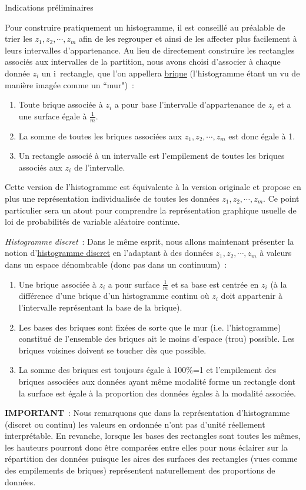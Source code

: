 \documentclass[10pt]{report}
\begin{document}
\begin{IndicList}{Indications préliminaires}
\begin{enumerate}
\end{enumerate}
Pour construire pratiquement un histogramme, il est conseillé au préalable de trier les $z_1,z_2,\cdots,z_m$ afin de les regrouper et ainsi de les affecter  plus facilement à leurs intervalles d'appartenance. Au lieu de directement construire les rectangles associés aux intervalles de la partition, nous avons choisi d'associer à chaque donnée $z_i$ un i\ieme\ rectangle, que l'on appellera \underline{brique} (l'histogramme étant un vu  de manière imagée comme un ``mur")~:
\begin{enumerate}
\item Toute brique associée à $z_i$ a pour base l'intervalle d'appartenance de $z_i$ et a une surface égale à $\frac1m$.
\item La somme de toutes les briques associées aux $z_1,z_2,\cdots,z_m$ est donc égale à 1.
\item Un rectangle associé à un intervalle est l'empilement de toutes les briques associés aux $z_i$ de l'intervalle.  
\end{enumerate}
Cette version de l'histogramme est équivalente à la version originale et propose en plus une représentation individualisée de toutes les données $z_1,z_2,\cdots,z_m$. Ce point particulier sera un atout pour comprendre la représentation graphique usuelle de loi de probabilités de variable aléatoire continue. 
\item \textit{Histogramme discret}~: Dans le même esprit, nous allons maintenant présenter la notion d'\underline{histogramme discret} en l'adaptant à des données $z_1,z_2,\cdots,z_m$ à valeurs dans un espace dénombrable (donc pas dans un continuum)~:
\begin{enumerate}
\item Une brique associée à $z_i$ a pour surface $\frac1m$ et sa base est centrée en $z_i$ (à la différence d'une brique d'un histogramme continu où $z_i$ doit appartenir à l'intervalle représentant la base de la brique).
\item Les bases des briques sont fixées de sorte que le mur (i.e. l'histogramme) constitué de l'ensemble des briques ait le moins d'espace (trou) possible. Les briques voisines doivent se toucher dès que possible.
\item La somme des briques est toujours égale à 100\%=1 et l'empilement des briques associées aux données ayant même modalité forme un rectangle dont la surface est égale à la proportion des données égales à la modalité associée.  
\end{enumerate}
\textbf{IMPORTANT}~: Nous remarquons que dans la représentation d'histogramme (discret ou continu) les valeurs en ordonnée n'ont pas d'unité réellement interprétable. En revanche, lorsque les bases des rectangles sont toutes les mêmes, les hauteurs pourront donc être comparées entre elles pour nous éclairer sur la répartition des données puisque les aires des surfaces des rectangles (vues comme des empilements de briques) représentent naturellement des proportions de données.  
\end{IndicList}
\end{document}
